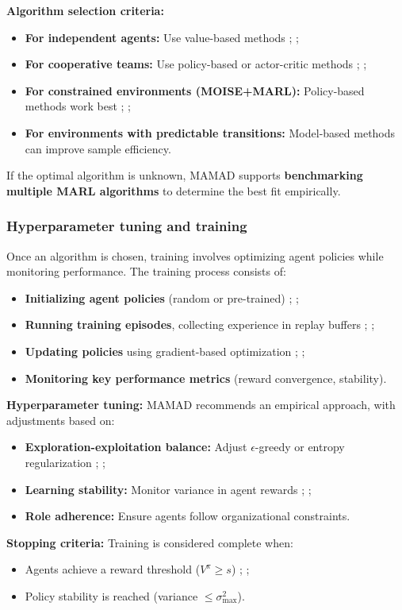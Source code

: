 \documentclass[pdflatex,sn-mathphys-num]{sn-jnl}%
\theoremstyle{thmstyleone}%
\theoremstyle{thmstyletwo}%
\theoremstyle{thmstylethree}%
\begin{document}
\noindent \textbf{Algorithm selection criteria:}
\begin{itemize}
    \item \textbf{For independent agents:} Use value-based methods ; ;
    \item \textbf{For cooperative teams:} Use policy-based or actor-critic methods ; ;
    \item \textbf{For constrained environments (MOISE+MARL):} Policy-based methods work best ; ;
    \item \textbf{For environments with predictable transitions:} Model-based methods can improve sample efficiency.
\end{itemize}

\noindent If the optimal algorithm is unknown, MAMAD supports \textbf{benchmarking multiple MARL algorithms} to determine the best fit empirically.

\subsubsection{Hyperparameter tuning and training}
Once an algorithm is chosen, training involves optimizing agent policies while monitoring performance. The training process consists of:
\begin{itemize}
    \item \textbf{Initializing agent policies} (random or pre-trained) ; ;
    \item \textbf{Running training episodes}, collecting experience in replay buffers ; ;
    \item \textbf{Updating policies} using gradient-based optimization ; ;
    \item \textbf{Monitoring key performance metrics} (reward convergence, stability).
\end{itemize}

\noindent \textbf{Hyperparameter tuning:}
MAMAD recommends an empirical approach, with adjustments based on:
\begin{itemize}
    \item \textbf{Exploration-exploitation balance:} Adjust $\epsilon$-greedy or entropy regularization ; ;
    \item \textbf{Learning stability:} Monitor variance in agent rewards ; ;
    \item \textbf{Role adherence:} Ensure agents follow organizational constraints.
\end{itemize}

\noindent \textbf{Stopping criteria:}
Training is considered complete when:
\begin{itemize}
    \item Agents achieve a reward threshold ($V^{\pi} \geq s$) ; ;
    \item Policy stability is reached (variance $\leq \sigma_{\max}^2$).
\end{itemize}
\end{document}

